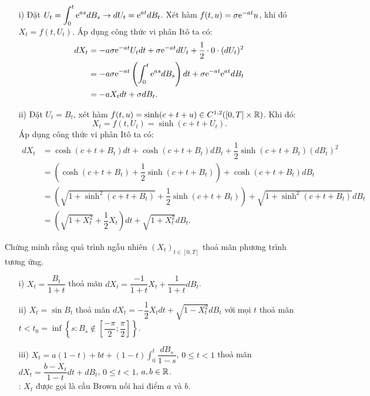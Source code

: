 \begin{sol*}
    \begin{itemize}
        \item[i)] Đặt $U_t = \displaystyle \int_0^t \mathrm{e}^{as} dB_s \rightarrow dU_t = \mathrm{e}^{at} dB_t$. Xét hàm $f(t,u)= \sigma \mathrm{e}^{-at}u$, khi đó $X_t = f(t,U_t)$. Áp dụng công thức vi phân Itô ta có:
        \begin{align*}
            dX_t &= -a \sigma \mathrm{e}^{-at}U_tdt+ \sigma \mathrm{e}^{-at} dU_t + \dfrac{1}{2} \cdot 0 \cdot (dU_t)^2\\
            &= -a \sigma \mathrm{e}^{-at} \left(\displaystyle \int_0^t \mathrm{e}^{as}dB_s\right)dt+ \sigma \mathrm{e}^{-at} \mathrm{e}^{at} dB_t \\
            &= -aX_tdt+ \sigma dB_t.
        \end{align*}       
        \item[ii)] Đặt $U_t = B_t$, xét hàm $f(t,u) = \sinh (c+t+u) \in C^{1,2}([0,T]\times \mathbb{R})$. Khi đó: \[X_t = f(t,U_t) =\sinh (c+t+U_t) .\]  Áp dụng công thức vi phân Itô ta có:
        \begin{align*}
            dX_t &= \cosh (c+t+B_t)dt + \cosh (c+t+B_t)dB_t + \dfrac{1}{2} \sinh (c+t+B_t)(dB_t)^2 \\
            &= \left(\cosh (c+t+B_t)+ \dfrac{1}{2} \sinh (c+t+B_t)\right) + \cosh (c+t+B_t)dB_t \\
            &= \left(\sqrt{1+ \sinh ^2(c+t+B_t) } + \dfrac{1}{2} \sinh (c+t+B_t) \right) + \sqrt{1+ \sinh ^2(c+t+B_t) } dB_t \\
            &= \left(\sqrt{1+X_t^2} + \dfrac{1}{2}X_t \right)dt + \sqrt{1+X_t^2}dB_t.
        \end{align*}
    \end{itemize}
\end{sol*}
\begin{exam*}
    Chứng minh rằng quá trình ngẫu nhiên $(X_t)_{t \in [0,T]}$ thoả mãn phương trình tương ứng.
\begin{itemize}
    \item[i)] $X_t = \dfrac{B_t}{1+t}$ thoả mãn $dX_t = \dfrac{-1}{1+t}X_t+\dfrac{1}{1+t}dB_t$.
    \item[ii)] $X_t = \sin B_t$ thoả mãn $dX_t = - \dfrac{1}{2}X_tdt + \sqrt{1-X_t^2}dB_t$ với mọi $t$ thoả mãn $t < t_0 = \inf\left\{s: B_s \notin \left[\dfrac{-\pi}{2} ; \dfrac{\pi}{2}\right]\right\}$.
    \item[iii)] $X_t = a(1-t) + bt + (1-t)\displaystyle \int_0^t \dfrac{dB_s}{1-s}$, $0 \leq t <1$ thoả mãn $dX_t = \dfrac{b-X_t}{1-t}dt + dB_t$, $0 \leq t <1$, $a,b \in \mathbb{R}$.\\
    \remarkname: $X_t$ được gọi là cầu Brown nối hai điểm $a$ và $b$.
\end{itemize}
\end{exam*}
